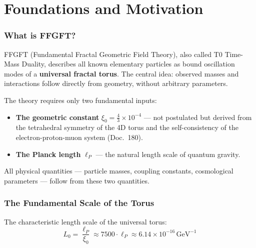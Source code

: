 
\part{Foundations and Motivation}

\section{What is FFGFT?}

FFGFT (Fundamental Fractal Geometric Field Theory), also called
T0 Time-Mass Duality, describes all known elementary particles
as bound oscillation modes of a \textbf{universal fractal torus}.
The central idea: observed masses and interactions follow directly
from geometry, without arbitrary parameters.

The theory requires only two fundamental inputs:

\begin{itemize}
  \item \textbf{The geometric constant}
    $\xi_0 = \frac{4}{3}\times 10^{-4}$ — not postulated but
    derived from the tetrahedral symmetry of the 4D torus and the
    self-consistency of the electron-proton-muon system (Doc.~180).
  \item \textbf{The Planck length} $\ell_P$ — the natural length scale
    of quantum gravity.
\end{itemize}

All physical quantities — particle masses, coupling constants,
cosmological parameters — follow from these two quantities.

\section{The Fundamental Scale of the Torus}

The characteristic length scale of the universal torus:
\begin{equation}
  L_0 = \frac{\ell_P}{\xi_0}
  \approx 7500 \cdot \ell_P
  \approx 6.14 \times 10^{-16}\,\text{GeV}^{-1}
\end{equation}

